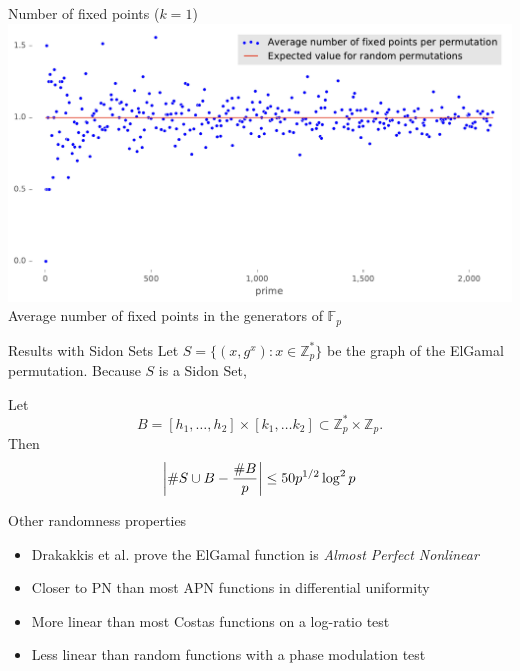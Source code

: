 \begin{frame}{Number of fixed points ($k=1$)}
        \centering
        \includegraphics[width=\textwidth]{figures/average_number_of_fixed_points_per_permutation}\\
{Average number of fixed points in the generators of $\mathbb{F}_p$}
\end{frame}


\begin{frame}{Results with Sidon Sets}
  Let $S = \{(x,g^x): x \in \mathbb{Z}_p^*\}$ be the graph of the ElGamal permutation. Because $S$ is a Sidon Set,

  \begin{theorem}
    Let
    \[
      B = [h_1,\ldots, h_2] \times [k_1,\ldots k_2] \subset \mathbb{Z}_p^* \times \mathbb{Z}_p.
    \]
    Then
    \[
      \left | \#{S \cup B} - \frac{\#{B}}{p} \right | \leq 50 p^{1/2} \log^2 p
\]
    \end{theorem}
\end{frame}

\begin{frame}{Other randomness properties}

  \begin{itemize}
  \item Drakakkis et al. prove the ElGamal function is {\em Almost Perfect Nonlinear}
    \item Closer to PN than most APN functions in differential uniformity
    \item More linear than most Costas functions on a log-ratio test
      \item Less linear than random functions with a phase modulation test 
    \end{itemize}
  
  \end{frame}



